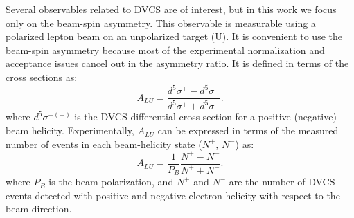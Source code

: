 \documentclass[twocolumn,nofootinbib,showpacs,prl,superscriptaddress,secnumarabic,amssymb,nobibnotes,aps,floatfix]{revtex4}
\begin{document}

Several observables related to DVCS are of interest, but in this work we focus only 
on the beam-spin asymmetry. This  observable is measurable using a polarized 
lepton beam on an unpolarized target (U). It is convenient to use the beam-spin 
asymmetry because most of the experimental normalization and acceptance issues 
cancel out in the asymmetry ratio. It is defined in terms of the cross sections 
as:
  \begin{equation}
  A_{LU} = \frac{d^{5}\sigma^{+} - d^{5}\sigma^{-} }
                {d^{5}\sigma^{+} + d^{5}\sigma^{-}}.
    \label{BSA_equation}
  \end{equation}
where $d^{5}\sigma^{+(-)}$ is the DVCS differential cross 
section for a positive (negative) beam helicity. Experimentally, $A_{LU}$ 
can be expressed in terms of the measured number of events in each 
beam-helicity state ($N^{+}$, $N^{-}$) as:
\begin{equation}
A_{LU} = \frac{1}{P_{B}} \frac{N^{+} - N^{-}}{N^{+} + N^{-} }.
\end{equation}
where $P_{B}$ is the beam polarization, and $N^{+}$ and $N^{-}$ are the number 
of DVCS events detected with positive and negative electron helicity with 
respect to the beam direction. 
\end{document}
